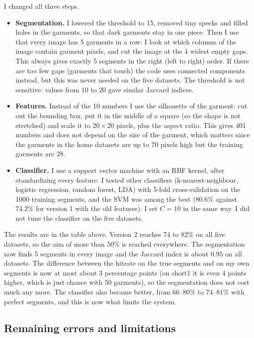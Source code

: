 \documentclass[11pt,a4paper]{article}
\begin{document}
I changed all three steps.

\begin{itemize}
  \item \textbf{Segmentation.} I lowered the threshold to 15, removed tiny specks and filled holes in the garments, so that
    dark garments stay in one piece. Then I use that every image has 5 garments in a row: I look at which columns of the image
    contain garment pixels, and cut the image at the 4 widest empty gaps. This always gives exactly 5 segments in the right
    (left to right) order. If there are too few gaps (garments that touch) the code uses connected components instead, but
    this was never needed on the five datasets. The threshold is not sensitive: values from 10 to 20 gave similar Jaccard indices.
  \item \textbf{Features.} Instead of the 10 numbers I use the silhouette of the garment: cut out the bounding box, put it in the middle
    of a square (so the shape is not stretched) and scale it to $20\times20$ pixels, plus the aspect ratio. This gives 401 numbers and does not depend
    on the size of the garment, which matters since the garments in the home datasets are up to $70$ pixels high but the training garments are $28$.
  \item \textbf{Classifier.} I use a support vector machine with an RBF kernel, after standardizing every feature. I tested other
    classifiers (k-nearest-neighbour, logistic regression, random forest, LDA) with 5-fold cross-validation on the 1000 training segments, and the
    SVM was among the best ($80.6\%$ against $74.2\%$ for version 1 with the old features). I set $C=10$ in the same way. I did not tune the classifier on the five datasets.
\end{itemize}

The results are in the table above. Version 2 reaches $74$ to $82\%$ on all five datasets, so the aim of more than $50\%$ is reached
everywhere. The segmentation now finds 5 segments in every image and the Jaccard index is about $0.95$ on all datasets. The difference
between the hitrate on the true segments and on my own segments is now at most about $3$ percentage points (on short1 it is even $4$ points higher, which is just
chance with 50 garments), so the segmentation does not cost much any more. The classifier also became better, from $66$--$80\%$ to $74$--$81\%$ with perfect segments, and this
is now what limits the system.

\subsection{Remaining errors and limitations}
\end{document}
